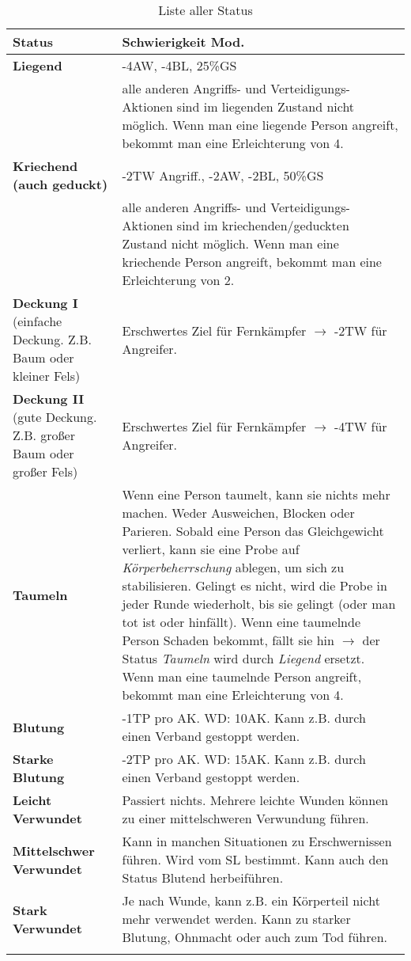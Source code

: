 \begin{longtable}{|p{4cm}|p{12cm}|}
\hline
\textbf{Status} & \textbf{Schwierigkeit Mod.} \\

\hline
\textbf{Liegend} & -4AW, -4BL, 25\%GS \\
                 & alle anderen Angriffs- und Verteidigungs-Aktionen sind im liegenden Zustand nicht möglich. Wenn man eine liegende Person angreift, bekommt man eine Erleichterung von 4. \\

\hline
\textbf{Kriechend (auch geduckt)} & -2TW Angriff., -2AW, -2BL, 50\%GS \\
                 & alle anderen Angriffs- und Verteidigungs-Aktionen sind im kriechenden/geduckten Zustand nicht möglich. Wenn man eine kriechende Person angreift, bekommt man eine Erleichterung von 2. \\
      
\hline
\textbf{Deckung I} (einfache Deckung. Z.B. Baum oder kleiner Fels) & Erschwertes Ziel für Fernkämpfer $\rightarrow$ -2TW für Angreifer. \\

\hline
\textbf{Deckung II} (gute Deckung. Z.B. großer Baum oder großer Fels) & Erschwertes Ziel für Fernkämpfer $\rightarrow$ -4TW für Angreifer. \\

\hline
\textbf{Taumeln} & Wenn eine Person taumelt, kann sie nichts mehr machen. Weder Ausweichen, Blocken oder Parieren. Sobald eine Person das Gleichgewicht verliert, kann sie eine Probe auf \textit{Körperbeherrschung} ablegen, um sich zu stabilisieren. Gelingt es nicht, wird die Probe in jeder Runde wiederholt, bis sie gelingt (oder man tot ist oder hinfällt). Wenn eine taumelnde Person Schaden bekommt, fällt sie hin $\rightarrow$ der Status \textit{Taumeln} wird durch \textit{Liegend} ersetzt. Wenn man eine taumelnde Person angreift, bekommt man eine Erleichterung von 4. \\

\hline
\textbf{Blutung} & -1TP pro AK. WD: 10AK. Kann z.B. durch einen Verband gestoppt werden. \\

\hline
\textbf{Starke Blutung} & -2TP pro AK. WD: 15AK. Kann z.B. durch einen Verband gestoppt werden. \\

\hline
\textbf{Leicht Verwundet} & Passiert nichts. Mehrere leichte Wunden können zu einer mittelschweren Verwundung führen. \\

\hline
\textbf{Mittelschwer Verwundet} & Kann in manchen Situationen zu Erschwernissen führen. Wird vom SL bestimmt. Kann auch den Status Blutend herbeiführen. \\

\hline
\textbf{Stark Verwundet} & Je nach Wunde, kann z.B. ein Körperteil nicht mehr verwendet werden. Kann zu starker Blutung, Ohnmacht oder auch zum Tod führen. \\

\hline
\caption{Liste aller Status}
\label{tab:Status}
\end{longtable}

